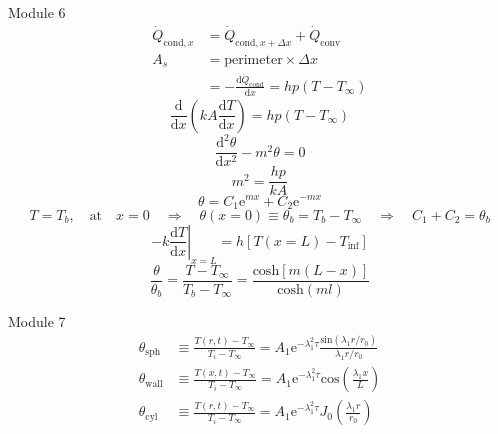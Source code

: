 \documentclass[24pt]{article}
\begin{document}
Module 6
\begin{align}
\dot{Q}_{\mathrm{cond},x} &= \dot{Q}_{\mathrm{cond},x+\Delta x} + \dot{Q}_\mathrm{conv} \\
A_s &= \text{perimeter} \times \Delta x \\
&= -\frac{\mathrm{d}\dot{Q}_\mathrm{cond}}{\mathrm{d}x} = h p (T-T_\infty)
\end{align}
\begin{equation}
\frac{\mathrm{d}}{\mathrm{d}x}\left(kA\frac{\mathrm{d}T}{\mathrm{d}x}\right) = h p (T-T_\infty)
\end{equation}
\begin{equation}
\frac{\mathrm{d}^2\theta}{\mathrm{d}x^2}-m^2\theta = 0
\end{equation}
\begin{equation}
m^2 = \frac{hp}{kA}
\end{equation}
\begin{equation}
\theta = C_1 \mathrm{e}^{mx} + C_2 \mathrm{e}^{-mx}
\end{equation}
\begin{equation}
T = T_b, \quad \text{at} \quad x=0 \quad \Rightarrow \quad \theta(x=0) \equiv \theta_b = T_b - T_\infty \quad \Rightarrow \quad C_1+C_2=\theta_b
\end{equation}
\begin{equation}
-k\left.\frac{\mathrm{d}T}{\mathrm{d}x}\right|_{x=L} = h[T(x=L)-T_\mathrm{inf}]
\end{equation}
\begin{equation}
\frac{\theta}{\theta_b} = \frac{T-T_\infty}{T_b-T_\infty} = \frac{\mathrm{cosh}[m(L-x)]}{\mathrm{cosh}(ml)}
\end{equation}



Module 7
\begin{align}
\theta_\mathrm{sph} &\equiv \frac{T(r,t)-T_\infty}{T_i-T_\infty}=A_1\mathrm{e}^{-\lambda_1^2 \tau}\frac{\mathrm{sin}(\lambda_1 r/r_0)}{\lambda_1 r/r_0} \\
\theta_\mathrm{wall} &\equiv \frac{T(x,t)-T_\infty}{T_i-T_\infty}=A_1\mathrm{e}^{-\lambda_1^2 \tau}\mathrm{cos}\left(\frac{\lambda_1 x}{L}\right) \\
\theta_\mathrm{cyl} &\equiv \frac{T(r,t)-T_\infty}{T_i-T_\infty}=A_1\mathrm{e}^{-\lambda_1^2 \tau}J_0\left(\frac{\lambda_1 r}{r_0}\right)
\end{align}
\end{document}
